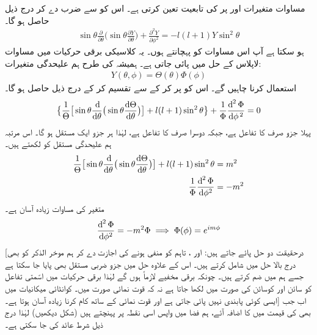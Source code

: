 مساوات  متغیرات     اور      پر   کی تابعیت  تعین کرتی ہے۔
اس کو     سے ضرب دے کر درج ذیل حاصل ہو گا۔
\begin{align}\label{مساوات_ابعادی_زاویائی_مساوات}
\sin{\theta}\frac{\partial}{\partial{\theta}}\big(\sin{\theta}\frac{\partial{Y}}{\partial{\theta}}\big)+\frac{\partial^{2}{Y}}{\partial{\phi^{2}}}=-l(l+1)Y\sin^{2}{\theta} 
\end{align}
ہو سکتا ہے آپ اس مساوات کو پہچانتے ہوں۔ یہ کلاسیکی برقی حرکیات میں مساوات لاپلاس کے حل میں پائی جاتی ہے۔ ہمیشہ کی طرح ہم علیحدگی متغیرات:
\begin{align}
Y(\theta,\phi)=\Theta(\theta)\Phi(\phi) 
\end{align}
استعمال کرنا  چاہیں گے۔ اس کو پر کر کے  سے تقسیم کر کے درج ذیل حاصل ہو گا۔ 
\begin{align*}
\big\{\frac{1}{\Theta}\big[\sin{\theta}\frac{\dif}{\dif\theta}\big(\sin\theta\frac{\dif{\Theta}}{\dif{\theta}}\big)\big]+l(l+1)\sin^{2}{\theta}\big\}+\frac{1}{\Phi}\frac{\dif^{\,2}{\Phi}}{\dif{\phi^{\,2}}}=0 
\end{align*}
پہلا جزو صرف     کا تفاعل ہے، جبکہ دوسرا صرف        کا تفاعل ہے، لہٰذا ہر  جزو ایک مستقل ہو گا۔ اس مرتبہ ہم علیحدگی مستقل کو     لکھتے ہیں۔
\begin{align}
\frac{1}{\Theta}\big[\sin{\theta}\frac{\dif}{\dif\theta}\big(\sin\theta\frac{\dif{\Theta}}{\dif{\theta}}\big)\big]+l(l+1)\sin^{2}{\theta}&=m^{2} \\
\frac{1}{\Phi}\frac{\dif^{\,2}{\Phi}}{\dif{\phi^{2}}}&=-m^{2}\label{مساوات_تین_ابعادی_ایم}
\end{align}
 متغیر   کی مساوات زیادہ آسان ہے۔
 \begin{align}
\frac{\dif^{\,2}{\Phi}}{\dif{\phi^{2}}}=-m^{2}\Phi\implies \Phi(\phi)=e^{im\phi} 
\end{align}
[درحقیقت  دو حل پائے جاتے ہیں:  اور ، تاہم  کو منفی ہونے کی اجازت دے کر ہم موخر الذکر کو بھی درج بالا حل میں شامل کرتے ہیں۔ اس کے علاوہ حل میں  جزو ضربی مستقل بھی پایا جا  سکتا ہے جسے ہم     میں ضم کرتے ہیں۔ چونکہ برقی مخفیے   لازماً  ہوں  گے   لہٰذا برقی حرکیات میں اسّمتی تفاعل     کو  سائن اور کوسائن کی صورت میں لکھا جاتا ہے  نہ کہ قوت نمائی صورت میں۔ کوانٹائی میکانیات میں ایسی کوئی پابندی نہیں پائی جاتی ہے اور قوت نمائی کے ساتھ کام کرنا زیادہ آسان ہوتا ہے۔] اب جب بھی     کی قیمت  میں   کا اضافہ آئے،  ہم فضا میں واپس اسی نقطہ پر پہنچتے ہیں (شکل   دیکھیں) لہٰذا درج ذیل شرط عائد  کی جا سکتی ہے۔
